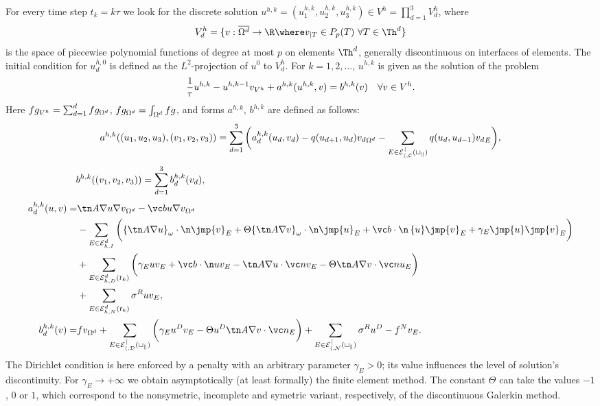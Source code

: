For every time step $t_k=k\tau$ we look for the discrete solution $u^{h,k}=(u_1^{h,k},u_2^{h,k},u_3^{h,k})\in V^h=\prod_{d=1}^3 V_d^h$,
 where
$$ V_d^h = \{v:\overline{\Omega^d}\to\R\where v_{|T}\in P_p(T)~\forall T\in\Th^d\} $$
is the space of piecewise polynomial functions of degree at most $p$ on elements $\Th^d$,
 generally discontinuous on interfaces of elements.
The initial condition for $u_d^{h,0}$ is defined as the $L^2$-projection of $u^0$ to $V_d^h$.
For $k=1,2,\ldots$, $u^{h,k}$ is given as the solution of the problem
\begin{equation*}
 \frac1\tau\sc{u^{h,k}-u^{h,k-1}}{v}_{V^h} + a^{h,k}(u^{h,k},v) = b^{h,k}(v) \quad \forall v\in V^h.
\end{equation*}
Here $\sc{f}{g}_{V^h}=\sum_{d=1}^d\sc{f}{g}_{\Omega^d}$, $\sc{f}{g}_{\Omega^d}=\int_{\Omega^d} f g$,
 and forms $a^{h,k}$, $b^{h,k}$
 are defined as follows:
\[
  a^{h,k}((u_1,u_2,u_3),(v_1,v_2,v_3))
   = \sum_{d=1}^3\bigg( a^{h,k}_d(u_d,v_d)
    - \sc{q(u_{d+1},u_d)}{v_d}_{\Omega^d}
    - \sum_{E\in\mathcal E_{h,C}^d(t_k)}\sc{q(u_d,u_{d-1})}{v_d}_E \bigg),
\]
\[ b^{h,k}((v_1,v_2,v_3)) = \sum_{d=1}^3 b^{h,k}_d(v_d), \mbox{\hspace{11.7cm}} \]
\begin{align*}
 a^{h,k}_d(u,v) = &\sc{\tn A\nabla u}{\nabla v}_{\Omega^d}
 - \sc{\vc b u}{\nabla v}_{\Omega^d}\\
 &- \sum_{E\in\Ehint^d}\bigg(\sc{\wavg{\tn A\nabla u}\cdot\n}{\jmp{v}}_E + \Theta\sc{\wavg{\tn A\nabla v}\cdot\n}{\jmp{u}}_E
 + \sc{\vc b\cdot\n\avg{u}}{\jmp{v}}_E
 + \gamma_E\sc{\jmp{u}}{\jmp{v}}_E\bigg)\\
 &+ \sum_{E\in\Ehdir^d(t_k)}\bigg(\gamma_E\sc{u}{v}_E + \sc{\vc b\cdot\n u}{v}_E - \sc{\tn A\nabla u\cdot\vc n}{v}_E - \Theta\sc{\tn A\nabla v\cdot\vc n}{u}_E\bigg)\\
 &+ \sum_{E\in\Ehneu^d(t_k)}\sc{\sigma^R u}{v}_E,\\
% 
 b^{h,k}_d(v) = &\sc{f}{v}_{\Omega^d} + \sum_{E\in\Ehdir^d(t_k)}\bigg(\gamma_E\sc{u^D}{v}_E - \Theta\sc{u^D}{\tn A\nabla v\cdot\vc n}_E\bigg)
 + \sum_{E\in\Ehneu^d(t_k)}\sc{\sigma^R u^D-f^N}{v}_E.
\end{align*}
The Dirichlet condition is here enforced by a penalty with an arbitrary parameter $\gamma_E>0$;
 its value influences the level of solution's discontinuity.
For $\gamma_E\to+\infty$ we obtain asymptotically (at least formally) the finite element method.
The constant $\Theta$ can take the values $-1$, $0$ or $1$,
 which correspond to the nonsymetric, incomplete and symetric variant, respectively, of the discontinuous Galerkin method.

